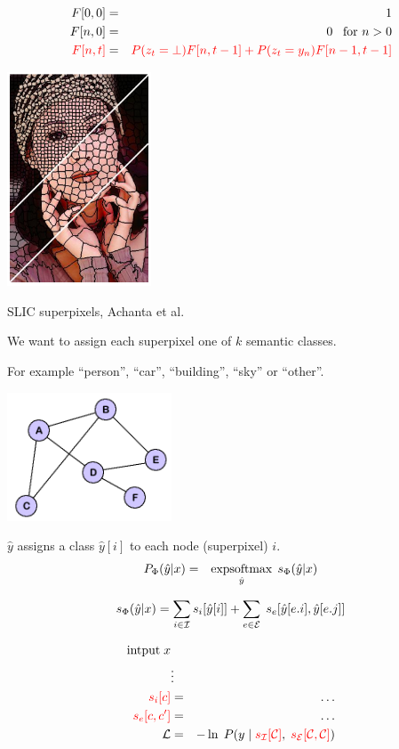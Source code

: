 {\begin{eqnarray*}
  F[0,0] & = & 1 \\
  F[n,0] & = & 0 \;\;\;\mbox{for $n > 0$} \\
  {\color{red} F[n,t]} & = & {\color{red} P(z_t = \bot) F[n,t-1] + P(z_t = y_n)F[n-1,t-1]}
\end{eqnarray*}

\centerline{\includegraphics[height = 2.5in]{../images/SLICcolor}}
\centerline{\huge SLIC superpixels, Achanta et al.}

\vfill
We want to assign each superpixel one of $k$ semantic classes.

\vfill
For example ``person'', ``car'', ``building'', ``sky'' or ``other''.

\bigskip
\centerline{\includegraphics[height= 1.5in]{../images/Graph}}
\medskip
$\hat{y} $ assigns a class $\hat{y}[i]$ to each node (superpixel) $i$.
\bigskip
\bigskip
{\color{red}
\begin{eqnarray*}
P_\Phi(\hat{y}|x) & = & \operatorname*{expsoftmax}_{\hat{y}}\;s_\Phi(\hat{y}|x)
\end{eqnarray*}
}

\vfill
{\color{red} $$s_\Phi(\hat{y}|x) = \sum_{i \in {\cal I}} s_i[\hat{y}[i]] + \sum_{e \in {\cal E}}\;s_e[\hat{y}[e.i],\hat{y}[e.j]]$$}


\vfill
\begin{eqnarray*}
\mbox{intput}\; x \\
 & \vdots & \\
{\color{red} s_i[c]} & = & \ldots \\
{\color{red} s_e[c,c']} & = & \ldots \\
{\cal L} & = & - \ln\; P(y\;|\;{\color{red} s_{\cal I}[{\cal C}]},\;{\color{red} s_{\cal E}[{\cal C}, {\cal C}]})
\end{eqnarray*}

}
